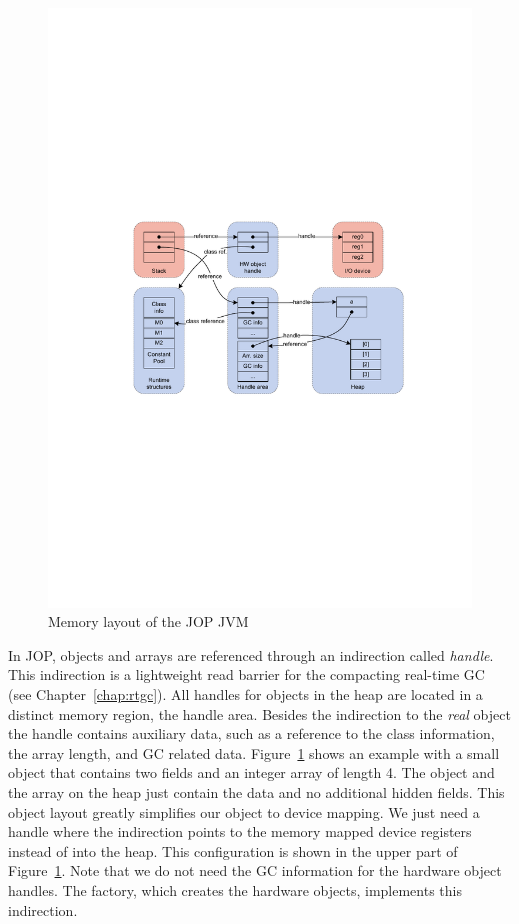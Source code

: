 \begin{figure}[t]
    \centering
    \includegraphics[scale=\picscale]{io/memory}
    \caption{Memory layout of the JOP JVM}\label{fig:hwo:mem}
\end{figure}

In JOP, objects and arrays are referenced through an indirection
called \emph{handle}. This indirection is a lightweight read barrier
for the compacting real-time GC (see Chapter~\ref{chap:rtgc}). All
handles for objects in the heap are located in a distinct memory
region, the handle area. Besides the indirection to the \emph{real}
object the handle contains auxiliary data, such as a reference to the
class information, the array length, and GC related data.
Figure~\ref{fig:hwo:mem} shows an example with a small object that
contains two fields and an integer array of length 4. The object and
the array on the heap just contain the data and no additional hidden
fields. This object layout greatly simplifies our object to device
mapping. We just need a handle where the indirection points to the
memory mapped device registers instead of into the heap. This
configuration is shown in the upper part of Figure~\ref{fig:hwo:mem}.
Note that we do not need the GC information for the hardware object
handles. The factory, which creates the hardware objects, implements
this indirection.

